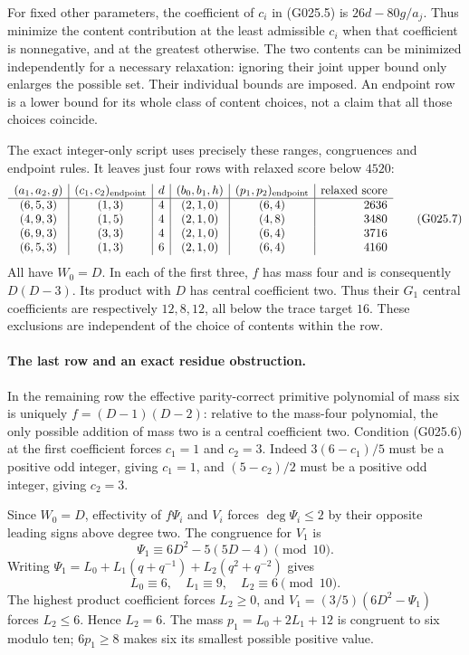 For fixed other parameters, the coefficient of $c_i$
in (G025.5) is $26d-80g/a_j$. Thus minimize the
content contribution at the least admissible $c_i$
when that coefficient is nonnegative, and at the
greatest otherwise. The two contents can be minimized
independently for a necessary relaxation: ignoring
their joint upper bound only enlarges the possible
set. Their individual bounds are imposed. An endpoint
row is a lower bound for its whole class of content
choices, not a claim that all those choices coincide.

The exact integer-only script
uses precisely these ranges, congruences and endpoint
rules. It leaves just four rows with relaxed score
below $4520$:
\[
\begin{array}{c|c|c|c|c|r}
(a_1,a_2,g)&(c_1,c_2)_{\rm endpoint}&d&(b_0,b_1,h)&
 (p_1,p_2)_{\rm endpoint}&\text{relaxed score}\\\hline
(6,5,3)&(1,3)&4&(2,1,0)&(6,4)&2636\\
(4,9,3)&(1,5)&4&(2,1,0)&(4,8)&3480\\
(6,9,3)&(3,3)&4&(2,1,0)&(6,4)&3716\\
(6,5,3)&(1,3)&6&(2,1,0)&(6,4)&4160
\end{array}                                                        \tag{G025.7}
\]
All have $W_0=D$. In each of the first three,
$f$ has mass four and is consequently $D(D-3)$.
Its product with $D$ has central coefficient two.
Thus their $G_1$ central coefficients are respectively
$12,8,12$, all below the trace target $16$.
These exclusions are independent of the choice of
contents within the row.

\paragraph{The last row and an exact residue obstruction.}
In the remaining row the effective parity-correct
primitive polynomial of mass six is uniquely
$f=(D-1)(D-2)$: relative to the mass-four polynomial,
the only possible addition of mass two is a central
coefficient two. Condition (G025.6) at the first
coefficient forces $c_1=1$ and $c_2=3$. Indeed
$3(6-c_1)/5$ must be a positive odd integer, giving
$c_1=1$, and $(5-c_2)/2$ must be a positive odd
integer, giving $c_2=3$.

Since $W_0=D$, effectivity of $f\Psi_i$ and $V_i$
forces $\deg\Psi_i\le2$ by their opposite leading
signs above degree two. The congruence for $V_1$ is
\[
 \Psi_1\equiv6D^2-5(5D-4)\pmod{10}.
\]
Writing $\Psi_1=L_0+L_1(q+q^{-1})+L_2(q^2+q^{-2})$
gives
\[
 L_0\equiv6,\quad L_1\equiv9,\quad L_2\equiv6
       \pmod{10}.                                      \tag{G025.8}
\]
The highest product coefficient forces $L_2\ge0$,
and $V_1=(3/5)(6D^2-\Psi_1)$ forces $L_2\le6$.
Hence $L_2=6$. The mass $p_1=L_0+2L_1+12$ is
congruent to six modulo ten; $6p_1\ge8$ makes
six its smallest possible positive value.

